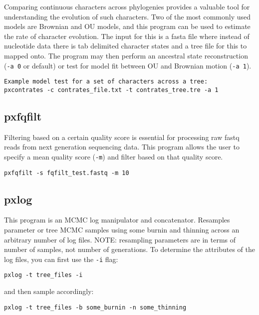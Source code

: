 \documentclass[12pt,letterpaper]{memoir}
\begin{document}
Comparing continuous characters across phylogenies provides a valuable tool for understanding the evolution of such characters. Two of the most commonly used models are Brownian and OU models, and this program can be used to estimate the rate of character evolution. The input for this is a fasta file where instead of nucleotide data there is tab delimited character states and a tree file for this to mapped onto. The program may then perform an ancestral state reconstruction (\texttt{-a 0} or default) or test for model fit between OU and Brownian motion (\texttt{-a 1}).

\begin{flushleft}
\begin{verbatim}
Example model test for a set of characters across a tree:
pxcontrates -c contrates_file.txt -t contrates_tree.tre -a 1
\end{verbatim}
\end{flushleft}

\subsection{pxfqfilt}

Filtering based on a certain quality score is essential for processing raw fastq reads from next generation sequencing data. This program allows the user to specify a mean quality score (\texttt{-m}) and filter based on that quality score.

\begin{flushleft}
\begin{verbatim}
pxfqfilt -s fqfilt_test.fastq -m 10
\end{verbatim}
\end{flushleft}

\subsection{pxlog}

This program is an MCMC log manipulator and concatenator. Resamples parameter or tree MCMC samples using some burnin and thinning across an arbitrary number of log files. NOTE: resampling parameters are in terms of number of samples, not number of generations. To determine the attributes of the log files, you can first use the \texttt{-i} flag:

\begin{flushleft}
\begin{verbatim}
pxlog -t tree_files -i
\end{verbatim}
\end{flushleft}
and then sample accordingly:
\begin{flushleft}
\begin{verbatim}
pxlog -t tree_files -b some_burnin -n some_thinning
\end{verbatim}
\end{flushleft}
\end{document}
